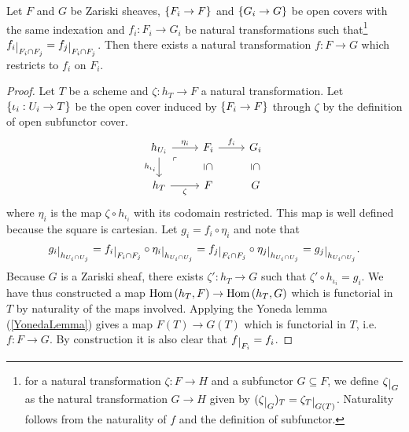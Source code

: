 \begin{proposition}\label{MapGluingForZariskiSheaves}
Let $F$ and $G$ be Zariski sheaves, $\left\{{F_i\to F}\right\}$ and $\left\{{G_i\to G}\right\}$ be open covers with the same indexation and $f_i:F_i\to G_i$ be natural transformations such that\footnote{for a natural transformation $\zeta:F\to H$ and a subfunctor $G\subseteq F$, we define $\zeta\res G$ as the natural transformation $G\to H$ given by $(\zeta\res G)_T=\zeta_T\res{G(T)}$. Naturality follows from the naturality of $f$ and the definition of subfunctor.} $f_i\res{F_i\cap F_j}=f_j\res{F_i\cap F_j}$. 
Then there exists a natural transformation $f:F\to G$ which restricts to $f_i$ on $F_i$.
\end{proposition}
\begin{proof}
Let $T$ be a scheme and $\zeta:h_T\to F$ a natural transformation. Let $\left\{{\iota_i:U_i\to T}\right\}$ be the open cover induced by $\left\{{F_i\to F}\right\}$ through $\zeta$ by the definition of open subfunctor cover.
\[\begin{tikzcd}
	{h_{U_i}} & {F_i} & {G_i} \\
	{h_T} & F & G
	\arrow["{\eta_i}", from=1-1, to=1-2]
	\arrow["{h_{\iota_i}}"', from=1-1, to=2-1]
	\arrow["\ulcorner"{anchor=center, pos=0.125}, draw=none, from=1-1, to=2-2]
	\arrow["{f_i}", from=1-2, to=1-3]
	\arrow["\subseteq"{marking, allow upside down}, draw=none, from=1-2, to=2-2]
	\arrow["\subseteq"{marking, allow upside down}, draw=none, from=1-3, to=2-3]
	\arrow["\zeta"', from=2-1, to=2-2]
\end{tikzcd}\]
where $\eta_i$ is the map $\zeta\circ h_{\iota_i}$ with its codomain restricted. This map is well defined because the square is cartesian.
Let $g_i=f_i\circ \eta_i$ and note that
\[g_i\res{h_{U_i\cap U_j}}=f_i\res{F_i\cap F_j}\circ \eta_i \res{h_{U_i\cap U_j}}=f_j\res{F_i\cap F_j}\circ \eta_j\res{h_{U_i\cap U_j}}=g_j\res{h_{U_i\cap U_j}}.\]
Because $G$ is a Zariski sheaf, there exists $\zeta':h_T\to G$ such that $\zeta'\circ h_{\iota_i}=g_i$. We have thus constructed a map $\mathrm{Hom}\,(h_T,F)\to \mathrm{Hom}\,(h_T,G)$ which is functorial in $T$ by naturality of the maps involved. Applying the Yoneda lemma (\ref{YonedaLemma}) gives a map $F(T)\to G(T)$ which is functorial in $T$, i.e. $f:F\to G$. By construction it is also clear that $f\res{F_i}=f_i$.
\end{proof}
